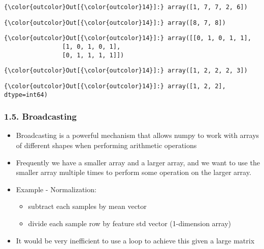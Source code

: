 \documentclass[11pt]{article}
\providecommand{\tightlist}{%
      \setlength{\itemsep}{0pt}\setlength{\parskip}{0pt}}
\begin{document}
\begin{Verbatim}[commandchars=\\\{\}]
{\color{outcolor}Out[{\color{outcolor}14}]:} array([1, 7, 7, 2, 6])
\end{Verbatim}
            
\begin{Verbatim}[commandchars=\\\{\}]
{\color{outcolor}Out[{\color{outcolor}14}]:} array([8, 7, 8])
\end{Verbatim}
            
\begin{Verbatim}[commandchars=\\\{\}]
{\color{outcolor}Out[{\color{outcolor}14}]:} array([[0, 1, 0, 1, 1],
                [1, 0, 1, 0, 1],
                [0, 1, 1, 1, 1]])
\end{Verbatim}
            
\begin{Verbatim}[commandchars=\\\{\}]
{\color{outcolor}Out[{\color{outcolor}14}]:} array([1, 2, 2, 2, 3])
\end{Verbatim}
            
\begin{Verbatim}[commandchars=\\\{\}]
{\color{outcolor}Out[{\color{outcolor}14}]:} array([1, 2, 2], dtype=int64)
\end{Verbatim}
            
    \hypertarget{broadcasting}{%
\subsubsection{1.5. Broadcasting}\label{broadcasting}}

\begin{itemize}
\tightlist
\item
  Broadcasting is a powerful mechanism that allows numpy to work with
  arrays of different shapes when performing arithmetic operations
\item
  Frequently we have a smaller array and a larger array, and we want to
  use the smaller array multiple times to perform some operation on the
  larger array.
\item
  Example - Normalization:

  \begin{itemize}
  \tightlist
  \item
    subtract each samples by mean vector
  \item
    divide each sample row by feature std vector (1-dimension array)\\
  \end{itemize}
\item
  It would be very inefficient to use a loop to achieve this given a
  large matrix
\end{itemize}
\end{document}
